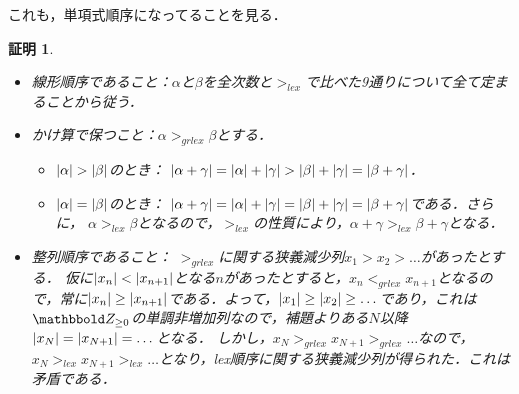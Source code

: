 \documentclass[9pt]{ltjsarticle}
\theoremstyle{break}
\theoremstyle{break}
\theoremstyle{break}
\theoremstyle{break}
\theoremstyle{break}
\theoremstyle{break}
\theoremstyle{break}
\theoremstyle{break}
\theoremstyle{break}
\theoremstyle{break}
\theoremstyle{break}
\theoremstyle{break}
\theoremstyle{break}
\theoremstyle{break}
\theoremstyle{break}
\theoremstyle{nonumberbreak}
\newtheorem{myproof}{証明}
\theoremstyle{nonumberbreak}
\begin{document}
これも，単項式順序になってることを見る．
\begin{myproof}
 \begin{itemize}
  \item 線形順序であること：$\alpha$と$\beta$を全次数と$>_{lex}$で比べた9通りについて全て定まることから従う．
  \item かけ算で保つこと：$\alpha >_{grlex} \beta$とする．
\begin{itemize}
 \item $\myabs{\alpha}> \myabs{\beta}$のとき：
$\left|\alpha + \gamma\right| = \left|\alpha\right| + \left|\gamma\right| > \left|\beta\right|+\left|\gamma\right| = \left|\beta+\gamma\right|$．
 \item $\left|\alpha\right| = \left|\beta\right|$のとき：
$\left|\alpha + \gamma\right| = \left|\alpha\right| +\left|\gamma\right| = \left|\beta\right|+\left|\gamma\right| = \left|\beta + \gamma\right|$である．さらに，
$\alpha >_{lex} \beta$となるので，$>_{lex}$の性質により，$\alpha + \gamma >_{lex} \beta + \gamma$となる．
\end{itemize}
  \item 整列順序であること：
$>_{grlex}$に関する狭義減少列$x_1 > x_2 > \dots$があったとする．
仮に$\left|x_n\right| < \left|x_{n+1}\right|$となる$n$があったとすると，$x_n <_{grlex} x_{n+1}$となるので，常に$\left|x_n\right| \ge \left|x_{n+1}\right|$である．よって，$\left|x_1\right| \ge \left|x_2\right| \ge \dots$であり，これは$\Zge$の単調非増加列なので，補題よりある$N$以降$\left|x_{N}\right|=\left|x_{N+1}\right|=\dots$となる．
しかし，$x_N >_{grlex} x_{N+1} >_{grlex} \dots$なので，$x_{N} >_{lex} x_{N+1} >_{lex} \dots$となり，lex順序に関する狭義減少列が得られた．これは矛盾である．
 \end{itemize}
\end{myproof}
\end{document}
